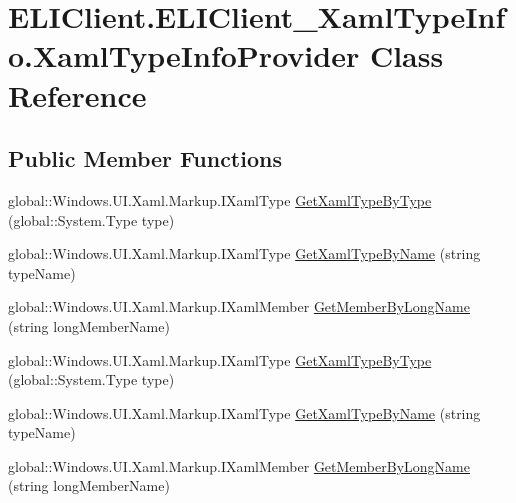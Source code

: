\hypertarget{class_e_l_i_client_1_1_e_l_i_client___xaml_type_info_1_1_xaml_type_info_provider}{}\section{E\+L\+I\+Client.\+E\+L\+I\+Client\+\_\+\+Xaml\+Type\+Info.\+Xaml\+Type\+Info\+Provider Class Reference}
\label{class_e_l_i_client_1_1_e_l_i_client___xaml_type_info_1_1_xaml_type_info_provider}
\subsection*{Public Member Functions}
\begin{DoxyCompactItemize}
\item 
global\+::\+Windows.\+U\+I.\+Xaml.\+Markup.\+I\+Xaml\+Type \hyperlink{class_e_l_i_client_1_1_e_l_i_client___xaml_type_info_1_1_xaml_type_info_provider_aadb1638e0d9ca3d88b8241fcbfdb7fa1}{Get\+Xaml\+Type\+By\+Type} (global\+::\+System.\+Type type)
\item 
global\+::\+Windows.\+U\+I.\+Xaml.\+Markup.\+I\+Xaml\+Type \hyperlink{class_e_l_i_client_1_1_e_l_i_client___xaml_type_info_1_1_xaml_type_info_provider_a9a7ee44624a8f05d29bee33253a2c26c}{Get\+Xaml\+Type\+By\+Name} (string type\+Name)
\item 
global\+::\+Windows.\+U\+I.\+Xaml.\+Markup.\+I\+Xaml\+Member \hyperlink{class_e_l_i_client_1_1_e_l_i_client___xaml_type_info_1_1_xaml_type_info_provider_a2cc8367d32444aa8fced5ac7a199a576}{Get\+Member\+By\+Long\+Name} (string long\+Member\+Name)
\item 
global\+::\+Windows.\+U\+I.\+Xaml.\+Markup.\+I\+Xaml\+Type \hyperlink{class_e_l_i_client_1_1_e_l_i_client___xaml_type_info_1_1_xaml_type_info_provider_aadb1638e0d9ca3d88b8241fcbfdb7fa1}{Get\+Xaml\+Type\+By\+Type} (global\+::\+System.\+Type type)
\item 
global\+::\+Windows.\+U\+I.\+Xaml.\+Markup.\+I\+Xaml\+Type \hyperlink{class_e_l_i_client_1_1_e_l_i_client___xaml_type_info_1_1_xaml_type_info_provider_a9a7ee44624a8f05d29bee33253a2c26c}{Get\+Xaml\+Type\+By\+Name} (string type\+Name)
\item 
global\+::\+Windows.\+U\+I.\+Xaml.\+Markup.\+I\+Xaml\+Member \hyperlink{class_e_l_i_client_1_1_e_l_i_client___xaml_type_info_1_1_xaml_type_info_provider_a2cc8367d32444aa8fced5ac7a199a576}{Get\+Member\+By\+Long\+Name} (string long\+Member\+Name)

\end{DoxyCompactItemize}
